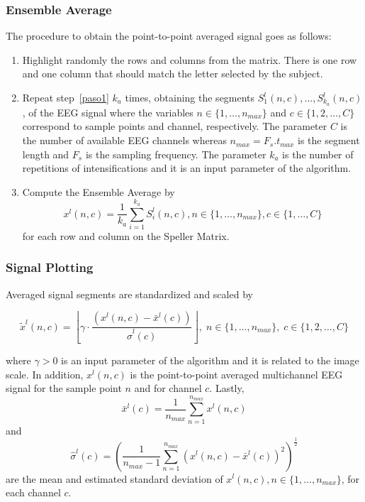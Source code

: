 \documentclass[utf8]{frontiersSCNS} %
\begin{document}
\subsubsection{Ensemble Average} \label{Average}

The procedure to obtain the point-to-point averaged signal goes as follows:

\begin{enumerate}
\item \label{paso1}Highlight randomly the rows and columns from the matrix.  There is one row and one column that should match the letter selected by the subject.
\item  \label{paso2} Repeat step~\ref{paso1} $k_a$ times, obtaining the segments $S_1^l(n,c),\dots,S_{k_a}^l(n,c)$, of the EEG signal where the variables $n \in \{1, \dots, n_{max}\}$ and $c \in \{1,2,\dots,C\}$ correspond to sample points and channel, respectively. The parameter $C$ is the number of available EEG channels whereas $n_{max}=F_s.t_{max}$ is the segment length and $F_s$ is the sampling frequency.  The parameter $k_a$ is the number of repetitions of intensifications and it is an input parameter of the algorithm.
\item \label{paso3} Compute the Ensemble Average by
\begin{equation}
x^l(n,c)= \frac{1}{k_a}\sum_{i=1}^{k_a}S_i^l(n,c),n \in \{1, \dots, n_{max}\}, c \in \{1,\dots,C\}
\label{averaging}
\end{equation}  
for each row and column on the Speller Matrix. 
\end{enumerate}

\subsubsection{Signal Plotting} \label{Plot}

Averaged signal segments are standardized and scaled by 

\begin{equation}
\tilde{x}^l(n,c) = \left \lfloor{ \gamma \cdot \frac{( x^l(n,c) - \bar{x}^l(c)  )}{ \hat{\sigma}^l(c) } }\right \rfloor, \; n \in \{ 1, \dots, n_{max}\},\; c \in \{1,2,\dots,C\}
\label{eq:standarizedaverages}
\end{equation}

\noindent where $\gamma > 0$ is an input parameter of the algorithm and  it is related to the image scale. In addition, $ x^l(n,c) $ is the point-to-point averaged multichannel EEG signal for the sample point $n$ and for channel $c$. Lastly, $$\bar{x}^l(c) =\frac{1}{n_{max}}\sum_{n=1}^{n_{max}}x^l(n,c)$$ and $$ \hat{\sigma}^l(c) = (\frac{1}{n_{max}-1}\sum_{n=1}^{n_{max}}(x^l(n,c)-\bar{x}^l(c))^2 )^{\frac{1}{2}}$$ are the mean and estimated standard deviation of $x^l(n,c), n \in \{1,\dots,n_{max}\} $, for each channel $c$.
\end{document}
